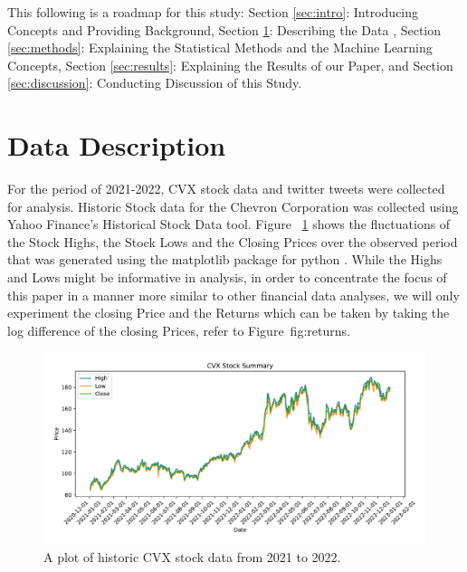 \documentclass[12pt, letterpaper, titlepage]{article}
\newcommand{\jy}[1]{\textcolor{blue}{JY: #1}}
\begin{document}
This following is a roadmap for this study: Section \ref{sec:intro}: Introducing Concepts and Providing Background, Section \ref{sec:datadesc}: Describing the Data , Section \ref{sec:methods}: Explaining the Statistical Methods and the Machine Learning Concepts, Section \ref{sec:results}: Explaining the Results of our Paper, and Section \ref{sec:discussion}: Conducting Discussion of this Study.



\section{Data Description} 
\label{sec:datadesc}


For the period of 2021-2022,  CVX stock data and twitter tweets were collected for analysis.
Historic Stock data for the Chevron Corporation was collected using Yahoo Finance's Historical Stock Data tool. Figure ~\ref{fig:stockdata} shows the fluctuations of the Stock Highs, the Stock Lows and the Closing Prices over the observed period that was generated using the matplotlib package for python \citep{Hunter_2007}. 
While the Highs and Lows might be informative in analysis, in order to concentrate the focus of this paper in a manner more similar to other financial data analyses, we will only experiment the closing Price and the Returns which can be taken by taking the log difference of the closing Prices, refer to Figure~{fig:returns}.
\begin{figure}[tbp]
  \begin{center}
  \includegraphics[width=\textwidth]{../figures/fig1.pdf}
  \caption{A plot of historic CVX stock data from 2021 to 2022.}\label{fig:stockdata}
  \end{center}
\end{figure}
\end{document}
